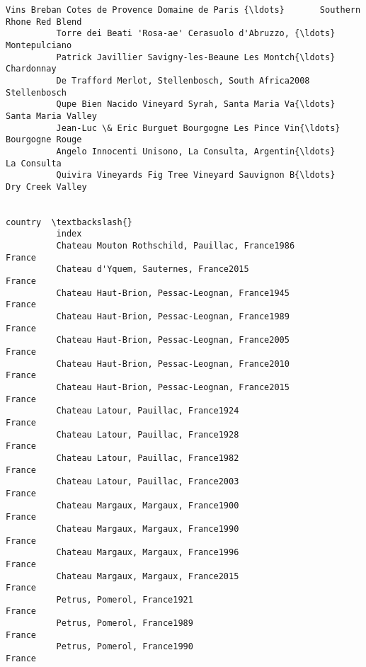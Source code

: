 \documentclass[11pt]{article}
\begin{document}
\begin{Verbatim}[commandchars=\\\{\}]
          Vins Breban Cotes de Provence Domaine de Paris {\ldots}       Southern Rhone Red Blend   
          Torre dei Beati 'Rosa-ae' Cerasuolo d'Abruzzo, {\ldots}                  Montepulciano   
          Patrick Javillier Savigny-les-Beaune Les Montch{\ldots}                     Chardonnay   
          De Trafford Merlot, Stellenbosch, South Africa2008                   Stellenbosch   
          Qupe Bien Nacido Vineyard Syrah, Santa Maria Va{\ldots}             Santa Maria Valley   
          Jean-Luc \& Eric Burguet Bourgogne Les Pince Vin{\ldots}                Bourgogne Rouge   
          Angelo Innocenti Unisono, La Consulta, Argentin{\ldots}                    La Consulta   
          Quivira Vineyards Fig Tree Vineyard Sauvignon B{\ldots}               Dry Creek Valley   
          
                                                                               country  \textbackslash{}
          index                                                                          
          Chateau Mouton Rothschild, Pauillac, France1986                       France   
          Chateau d'Yquem, Sauternes, France2015                                France   
          Chateau Haut-Brion, Pessac-Leognan, France1945                        France   
          Chateau Haut-Brion, Pessac-Leognan, France1989                        France   
          Chateau Haut-Brion, Pessac-Leognan, France2005                        France   
          Chateau Haut-Brion, Pessac-Leognan, France2010                        France   
          Chateau Haut-Brion, Pessac-Leognan, France2015                        France   
          Chateau Latour, Pauillac, France1924                                  France   
          Chateau Latour, Pauillac, France1928                                  France   
          Chateau Latour, Pauillac, France1982                                  France   
          Chateau Latour, Pauillac, France2003                                  France   
          Chateau Margaux, Margaux, France1900                                  France   
          Chateau Margaux, Margaux, France1990                                  France   
          Chateau Margaux, Margaux, France1996                                  France   
          Chateau Margaux, Margaux, France2015                                  France   
          Petrus, Pomerol, France1921                                           France   
          Petrus, Pomerol, France1989                                           France   
          Petrus, Pomerol, France1990                                           France   

\end{Verbatim}
\end{document}
